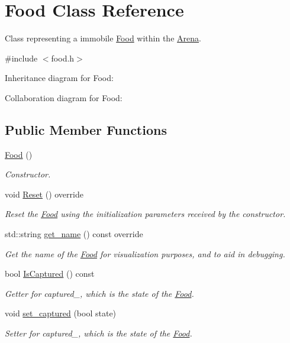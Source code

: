 \hypertarget{classFood}{}\section{Food Class Reference}
\label{classFood}


Class representing a immobile \hyperlink{classFood}{Food} within the \hyperlink{classArena}{Arena}.  




{\ttfamily \#include $<$food.\+h$>$}



Inheritance diagram for Food\+:


Collaboration diagram for Food\+:
\subsection*{Public Member Functions}
\begin{DoxyCompactItemize}
\item 
\hyperlink{classFood_a75d4d7f76fd495cc8133302ca9fdc485}{Food} ()
\begin{DoxyCompactList}\small\item\em Constructor. \end{DoxyCompactList}\item 
void \hyperlink{classFood_a1a12bfd50400e04b595c24a512317c1a}{Reset} () override\hypertarget{classFood_a1a12bfd50400e04b595c24a512317c1a}{}\label{classFood_a1a12bfd50400e04b595c24a512317c1a}

\begin{DoxyCompactList}\small\item\em Reset the \hyperlink{classFood}{Food} using the initialization parameters received by the constructor. \end{DoxyCompactList}\item 
std\+::string \hyperlink{classFood_a5c3bcd5109750a15ebb24b8a2a3cdd07}{get\+\_\+name} () const override
\begin{DoxyCompactList}\small\item\em Get the name of the \hyperlink{classFood}{Food} for visualization purposes, and to aid in debugging. \end{DoxyCompactList}\item 
bool \hyperlink{classFood_ad8a0272b043ea54dd8d3aa9fdbd014cf}{Is\+Captured} () const 
\begin{DoxyCompactList}\small\item\em Getter for captured\+\_\+, which is the state of the \hyperlink{classFood}{Food}. \end{DoxyCompactList}\item 
void \hyperlink{classFood_a1ad8a3c17f9ab764215320ec11c7c40d}{set\+\_\+captured} (bool state)\hypertarget{classFood_a1ad8a3c17f9ab764215320ec11c7c40d}{}\label{classFood_a1ad8a3c17f9ab764215320ec11c7c40d}

\begin{DoxyCompactList}\small\item\em Setter for captured\+\_\+, which is the state of the \hyperlink{classFood}{Food}. \end{DoxyCompactList}\end{DoxyCompactItemize}


